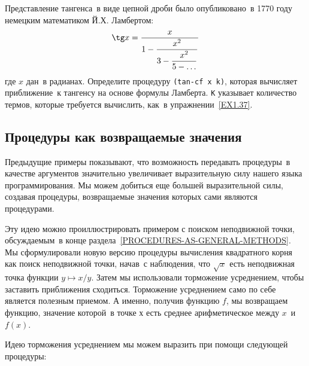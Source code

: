 \begin{exercise}{1.39}\label{EX1.39}%
%
%
%
Представление тангенса~в виде цепной дроби было
опубликовано~в 1770 году немецким математиком  Й.Х. Ламбертом:
$$
\tg x = \dfrac{x}{1 - \dfrac{x^2}{3 - \dfrac{x^2}{5 - \ldots}}}
$$%
где $x$ дан~в радианах.  Определите процедуру {\tt (tan-cf 
x k)}, которая вычисляет приближение~к тангенсу на основе
формулы Ламберта. {\tt K} указывает количество термов, которые
требуется вычислить, как~в упражнении~\ref{EX1.37}.
\end{exercise}

\subsection{Процедуры как возвращаемые значения}
\label{PROCEDURES-AS-RETURNED-VALUES}


Предыдущие примеры показывают, что возможность передавать
процедуры~в качестве аргументов значительно увеличивает выразительную
силу нашего языка программирования.  Мы можем добиться еще большей
выразительной силы, создавая процедуры, возвращаемые значения которых
сами являются процедурами.

Эту идею можно проиллюстрировать примером с
поиском неподвижной точки, обсуждаемым~в конце раздела~\ref{PROCEDURES-AS-GENERAL-METHODS}.  Мы
сформулировали новую версию процедуры вычисления квадратного корня как 
поиск неподвижной точки, начав~с наблюдения, что $\sqrt{x}$ 
есть неподвижная точка функции $y \mapsto x / y$.
Затем мы использовали торможение усреднением, чтобы заставить
приближения сходиться.  Торможение усреднением само по себе является
полезным приемом. А именно, получив функцию $f$, мы
возвращаем функцию, значение которой~в точке х есть среднее
арифметическое между $x$~и $f(x)$.

Идею торможения усреднением мы можем выразить при помощи
следующей процедуры:


